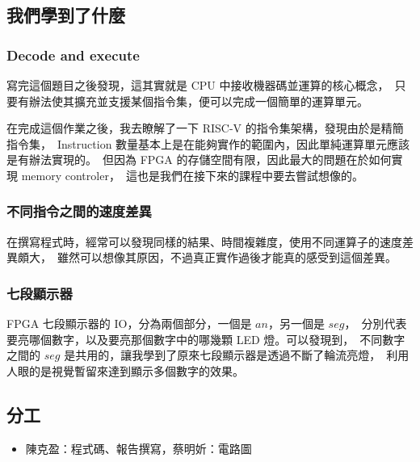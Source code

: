 \documentclass[10.5pt,compsoc,UTF8]{CjC}
\theoremstyle{mystyle}
\begin{document}
\subsection{我們學到了什麼}
\subsubsection*{Decode and execute}
寫完這個題目之後發現，這其實就是 CPU 中接收機器碼並運算的核心概念，\
只要有辦法使其擴充並支援某個指令集，便可以完成一個簡單的運算單元。
\par
在完成這個作業之後，我去瞭解了一下 RISC-V 的指令集架構，發現由於是精簡指令集，\
Instruction 數量基本上是在能夠實作的範圍內，因此單純運算單元應該是有辦法實現的。\
但因為 FPGA 的存儲空間有限，因此最大的問題在於如何實現 memory controler，\
這也是我們在接下來的課程中要去嘗試想像的。

\subsubsection*{不同指令之間的速度差異}
在撰寫程式時，經常可以發現同樣的結果、時間複雜度，使用不同運算子的速度差異頗大，\
雖然可以想像其原因，不過真正實作過後才能真的感受到這個差異。

\subsubsection*{七段顯示器}
FPGA 七段顯示器的 IO，分為兩個部分，一個是 $an$，另一個是 $seg$，\
分別代表要亮哪個數字，以及要亮那個數字中的哪幾顆 LED 燈。可以發現到，\
不同數字之間的 $seg$ 是共用的，讓我學到了原來七段顯示器是透過不斷了輪流亮燈，\
利用人眼的是視覺暫留來達到顯示多個數字的效果。

\subsection{分工}
\begin{itemize}
  \item 陳克盈：程式碼、報告撰寫，蔡明妡：電路圖
\end{itemize}
\end{document}
